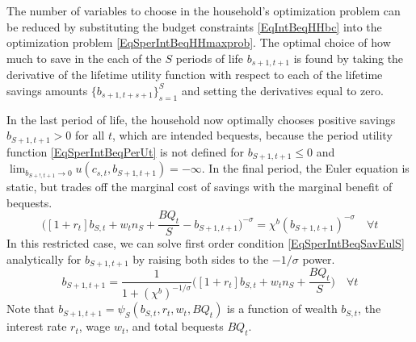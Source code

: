 \documentclass[letterpaper,12pt]{article}
\theoremstyle{definition}
\numberwithin{equation}{section}
\numberwithin{exercise}{section}
\begin{document}
\begin{spacing}{1.5}
      The number of variables to choose in the household's optimization problem can be reduced by substituting the budget constraints \eqref{EqIntBeqHHbc} into the optimization problem \eqref{EqSperIntBeqHHmaxprob}. The optimal choice of how much to save in the each of the $S$ periods of life $b_{s+1,t+1}$ is found by taking the derivative of the lifetime utility function with respect to each of the lifetime savings amounts $\{b_{s+1,t+s+1}\}_{s=1}^{S}$ and setting the derivatives equal to zero.

      In the last period of life, the household now optimally chooses positive savings $b_{S+1,t+1}>0$ for all $t$, which are intended bequests, because the period utility function \eqref{EqSperIntBeqPerUt} is not defined for $b_{S+1,t+1}\leq 0$ and $\lim_{b_{S+!,t+1}\rightarrow 0}u(c_{s,t},b_{S+1,t+1}) = -\infty$. In the final period, the Euler equation is static, but trades off the marginal cost of savings with the marginal benefit of bequests.
      \begin{equation}\label{EqSperIntBeqSavEulS}
         \biggl([1+r_t]b_{S,t} + w_t n_S + \frac{BQ_t}{S} - b_{S+1,t+1}\biggr)^{-\sigma} = \chi^b\left(b_{S+1,t+1}\right)^{-\sigma} \quad\forall t
      \end{equation}
      In this restricted case, we can solve first order condition \eqref{EqSperIntBeqSavEulS} analytically for $b_{S+1,t+1}$ by raising both sides to the $-1/\sigma$ power.
      \begin{equation}\label{EqSperIntBeqSavS}
         b_{S+1,t+1} = \frac{1}{1+(\chi^b)^{-1/\sigma}}\biggl([1+r_t]b_{S,t} + w_t n_S + \frac{BQ_t}{S}\biggr) \quad\forall t
      \end{equation}
      Note that $b_{S+1,t+1}=\psi_S\left(b_{S,t},r_t,w_t,BQ_t\right)$ is a function of wealth $b_{S,t}$, the interest rate $r_t$, wage $w_t$, and total bequests $BQ_t$.


\end{spacing}
\end{document}
